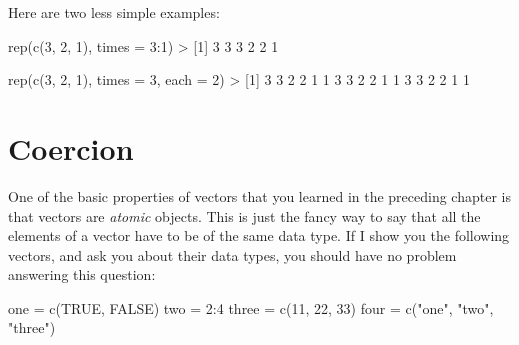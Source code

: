 \documentclass[
]{book}
\newenvironment{Shaded}{\begin{snugshade}}{\end{snugshade}}
\newcommand{\AttributeTok}[1]{\textcolor[rgb]{0.77,0.63,0.00}{#1}}
\newcommand{\ConstantTok}[1]{\textcolor[rgb]{0.00,0.00,0.00}{#1}}
\newcommand{\DecValTok}[1]{\textcolor[rgb]{0.00,0.00,0.81}{#1}}
\newcommand{\FunctionTok}[1]{\textcolor[rgb]{0.00,0.00,0.00}{#1}}
\newcommand{\NormalTok}[1]{#1}
\newcommand{\OtherTok}[1]{\textcolor[rgb]{0.56,0.35,0.01}{#1}}
\newcommand{\SpecialCharTok}[1]{\textcolor[rgb]{0.00,0.00,0.00}{#1}}
\newcommand{\StringTok}[1]{\textcolor[rgb]{0.31,0.60,0.02}{#1}}
\begin{document}
Here are two less simple examples:

\begin{Shaded}
\begin{Highlighting}[]
\FunctionTok{rep}\NormalTok{(}\FunctionTok{c}\NormalTok{(}\DecValTok{3}\NormalTok{, }\DecValTok{2}\NormalTok{, }\DecValTok{1}\NormalTok{), }\AttributeTok{times =} \DecValTok{3}\SpecialCharTok{:}\DecValTok{1}\NormalTok{)}
\SpecialCharTok{\textgreater{}}\NormalTok{ [}\DecValTok{1}\NormalTok{] }\DecValTok{3} \DecValTok{3} \DecValTok{3} \DecValTok{2} \DecValTok{2} \DecValTok{1}

\FunctionTok{rep}\NormalTok{(}\FunctionTok{c}\NormalTok{(}\DecValTok{3}\NormalTok{, }\DecValTok{2}\NormalTok{, }\DecValTok{1}\NormalTok{), }\AttributeTok{times =} \DecValTok{3}\NormalTok{, }\AttributeTok{each =} \DecValTok{2}\NormalTok{)}
\SpecialCharTok{\textgreater{}}\NormalTok{  [}\DecValTok{1}\NormalTok{] }\DecValTok{3} \DecValTok{3} \DecValTok{2} \DecValTok{2} \DecValTok{1} \DecValTok{1} \DecValTok{3} \DecValTok{3} \DecValTok{2} \DecValTok{2} \DecValTok{1} \DecValTok{1} \DecValTok{3} \DecValTok{3} \DecValTok{2} \DecValTok{2} \DecValTok{1} \DecValTok{1}
\end{Highlighting}
\end{Shaded}

\hypertarget{coercion}{%
\section{Coercion}\label{coercion}}

One of the basic properties of vectors that you learned in the preceding chapter
is that vectors are \emph{atomic} objects. This is just the fancy way to say that all
the elements of a vector have to be of the same data type. If I show you the
following vectors, and ask you about their data types, you should have no
problem answering this question:

\begin{Shaded}
\begin{Highlighting}[]
\NormalTok{one }\OtherTok{=} \FunctionTok{c}\NormalTok{(}\ConstantTok{TRUE}\NormalTok{, }\ConstantTok{FALSE}\NormalTok{)}
\NormalTok{two }\OtherTok{=} \DecValTok{2}\SpecialCharTok{:}\DecValTok{4}
\NormalTok{three }\OtherTok{=} \FunctionTok{c}\NormalTok{(}\DecValTok{11}\NormalTok{, }\DecValTok{22}\NormalTok{, }\DecValTok{33}\NormalTok{)}
\NormalTok{four }\OtherTok{=} \FunctionTok{c}\NormalTok{(}\StringTok{"one"}\NormalTok{, }\StringTok{"two"}\NormalTok{, }\StringTok{"three"}\NormalTok{)}
\end{Highlighting}
\end{Shaded}
\end{document}
